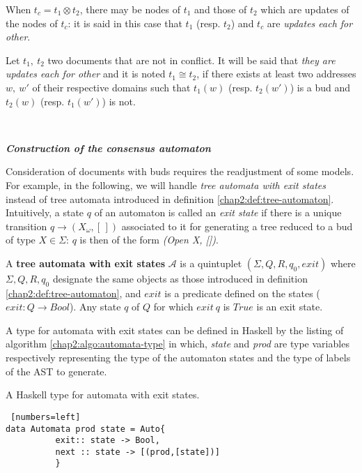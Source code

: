 When $t_c = t_1 \otimes t_2 $, there may be nodes of $t_1$ and those of $t_2$ which are updates of the nodes of $t_c$: it is said in this case that $t_1$ (resp. $t_2$) and $t_c$ are \textit{updates each for other}. 

\begin{definition}
\label{chap2:def:relation-cong}
Let $t_1, ~t_2$ two documents that are not in conflict. It will be said that \textit{they are updates each for other} and it is noted $t_1 \cong t_2$, if there exists at least two addresses $w, ~w'$ of their respective domains such that $t_1(w)$ (resp. $t_2(w')$) is a bud and $t_2(w)$ (resp. $t_1(w')$) is not.
\end{definition}


~

\noindent\textbf{\textit{Construction of the consensus automaton}}

Consideration of documents with buds requires the readjustment of some models. For example, in the following, we will handle \textit{tree automata with exit states} instead of tree automata introduced in definition \ref{chap2:def:tree-automaton}. Intuitively, a state $q$ of an automaton is called an \textit{exit state} if there is a unique transition $ q \rightarrow (X_\omega, [\, ])$ associated to it for generating a tree reduced to a bud of type $X \in \Sigma$: $q$ is then of the form \textit{(Open X, [])}.

\begin{definition}
A \textbf{tree automata with exit states} $\mathcal{A}$ is a quintuplet $(\Sigma,Q,R,q_0, \mathit{exit})$ where $\Sigma,Q,R,q_0$ designate the same objects as those introduced in definition \ref{chap2:def:tree-automaton}, and $\mathit{exit}$ is a predicate defined on the states ($\mathit{exit}: Q \rightarrow Bool$). Any state $q$ of $Q$ for which $\mathit{exit}~q$ is $\mathit{True}$ is an exit state.
\end{definition}

A type for automata with exit states can be defined in Haskell \cite{Antony} by the listing of algorithm \ref{chap2:algo:automata-type} in which, \textit{state} and \textit{prod} are type variables respectively representing the type of the automaton states and the type of labels of the AST to generate.
\begin{algorithm}
\small
\caption{A Haskell type for automata with exit states.}
\label{chap2:algo:automata-type}
\begin{Verbatim} [numbers=left]
data Automata prod state = Auto{
          exit:: state -> Bool, 
          next :: state -> [(prod,[state])]
          }
\end{Verbatim}
\end{algorithm}  

